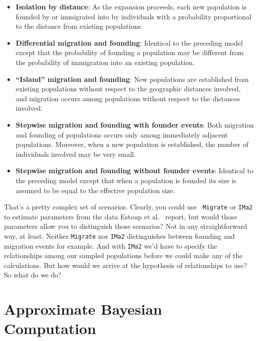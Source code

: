 \begin{itemize}

\item {\bf Isolation by distance}: As the expansion proceeds, each new
  population is founded by or immigrated into by individuals with a
  probability proportional to the distance from existing populations.

\item {\bf Differential migration and founding}: Identical to the
  preceding model except that the probability of founding a population
  may be different from the probability of immigration into an
  existing population.

\item {\bf ``Island'' migration and founding}: New populations are
  established from existing populations without respect to the
  geographic distances involved, and migration occurs among
  populations without respect to the distances involved.

\item {\bf Stepwise migration and founding with founder events}: Both
  migration and founding of populations occurs only among immediately
  adjacent populations. Moreover, when a new population is
  established, the number of individuals involved may be very small.

\item {\bf Stepwise migration and founding without founder events}:
  Identical to the preceding model except that when a population is
  founded its size is assumed to be equal to the effective population
  size. 

\end{itemize}

That's a pretty complex set of scenarios. Clearly, you could use {\tt
  Migrate} or {\tt IMa2} to estimate parameters from the data Estoup
et al.~\cite{Estoup-etal-2004} report, but would those parameters
allow you to distinguish those scenarios? Not in any straightforward
way, at least. Neither {\tt Migrate} nor {\tt IMa2} distinguishes
between founding and migration events for example. And with {\tt IMa2}
we'd have to specify the relationships among our sampled populations
before we could make any of the calculations. But how would we arrive
at the hypothesis of relationships to use? So what do we do?  

\section*{Approximate Bayesian Computation}

